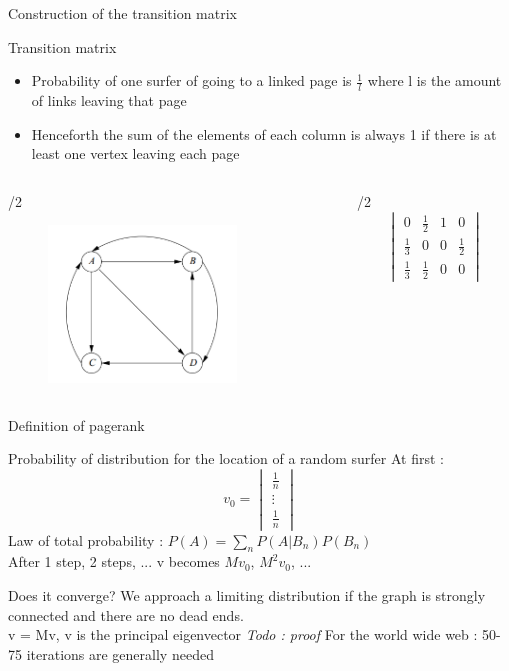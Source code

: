 \documentclass[10pt]{beamer}
\begin{document}
\begin{frame}{Construction of the transition matrix}
\begin{block}{Transition matrix}
\begin{itemize}
\item Probability of one surfer of going to a linked page is $\frac{1}{l}$ where l is the amount of links leaving that page
\item Henceforth the sum of the elements of each column is always 1 if there is at least one vertex leaving each page
\end{itemize}
\end{block}
\begin{columns}
\begin{column}{\paperwidth/2}
\begin{figure}
	\includegraphics[width = 5cm]{graph1.png}
\end{figure}
\end{column}
\begin{column}{\paperwidth/2}
$$\begin{vmatrix}
0 & \frac{1}{2} & 1 & 0 \\
\frac{1}{3} & 0 & 0 &\frac{1}{2} \\
\frac{1}{3} & \frac{1}{2}&  0& 0 

\end{vmatrix}$$
\end{column}
\end{columns}
\end{frame}
\begin{frame}{Definition of pagerank}
\begin{block}{Probability of distribution for the location of a random surfer}
At first : $$v_0 = \begin{vmatrix}\frac{1}{n}\\
				\vdots \\
				\frac{1}{n}\end{vmatrix}$$
Law of total probability : $P(A) = \sum_n P(A|B_n)P(B_n)$\\
After 1 step, 2 steps, ... v becomes $Mv_0$, $M^2v_0$, ...
\end{block}
\begin{block}{Does it converge?}
We approach a limiting distribution if the graph is strongly connected and there are no dead ends.\\
v = Mv, v is the principal eigenvector \textit{Todo : proof}
For the world wide web : 50-75 iterations are generally needed
\end{block}
\end{frame}
\end{document}
